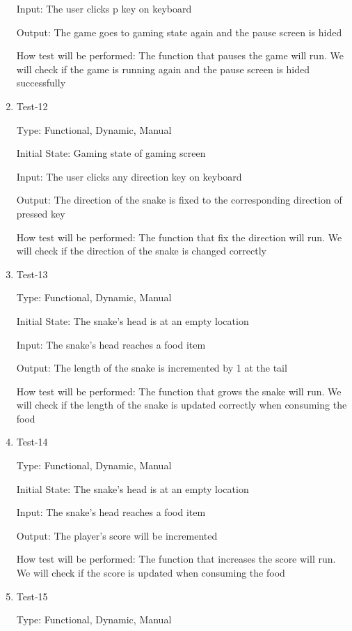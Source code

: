 \documentclass[12pt, titlepage]{article}
\begin{document}
\begin{enumerate}
Input: The user clicks p key on keyboard

Output: The game goes to gaming state again and the pause screen is hided

How test will be performed: The function that pauses the game will run. We will check if the game is running again and the pause screen is hided successfully

\item{Test-12\\}

Type: Functional, Dynamic, Manual

Initial State: Gaming state of gaming screen

Input: The user clicks any direction key on keyboard

Output: The direction of the snake is fixed to the corresponding direction of pressed key

How test will be performed: The function that fix the direction will run. We will check if the direction of the snake is changed correctly

\item{Test-13\\}

Type: Functional, Dynamic, Manual

Initial State: The snake's head is at an empty location

Input: The snake's head reaches a food item

Output: The length of the snake is incremented by 1 at the tail

How test will be performed: The function that grows the snake will run. We will check if the length of the snake is updated correctly when consuming the food

\item{Test-14\\}

Type: Functional, Dynamic, Manual

Initial State: The snake's head is at an empty location

Input: The snake's head reaches a food item

Output: The player's score will be incremented

How test will be performed: The function that increases the score will run. We will check if the score is updated when consuming the food

\item{Test-15\\}

Type: Functional, Dynamic, Manual


\end{enumerate}
\end{document}
